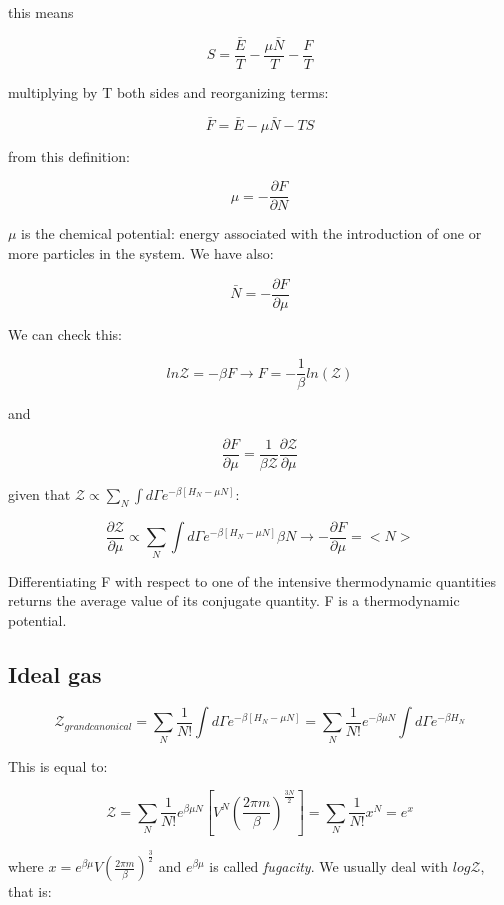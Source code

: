 \documentclass[a4paper, italian, openany]{book}
\begin{document}
this means

$$S = \frac{\bar{E}}{T} - \frac{\mu \bar{N}}{T} - \frac{F}{T}$$

multiplying by T both sides and reorganizing terms:

$$\bar{F} = \bar{E} - \mu\bar{N} -TS$$

from this definition:

$$\mu = -\frac{\partial F}{\partial N}$$

$\mu$ is the chemical potential: energy associated with the introduction of one or more particles in the system. We have also:

$$\bar{N} = -\frac{\partial F}{\partial \mu}$$

We can check this:

$$ln \mathcal{Z} = -\beta F \rightarrow F = -\frac{1}{\beta} ln(\mathcal{Z})$$

and

$$\frac{\partial F}{\partial \mu} = \frac{1}{\beta \mathcal{Z}} \frac{\partial \mathcal{Z}}{\partial \mu}$$

given that $\mathcal{Z} \propto \sum_N \int d\Gamma e^{-\beta\left [ H_N - \mu N \right ]}$:

$$\frac{\partial \mathcal{Z}}{\partial \mu} \propto \sum_N \int d\Gamma e^{-\beta \left [ H_N - \mu N \right ]} \beta N \rightarrow -\frac{\partial F}{\partial \mu} = <N>$$

Differentiating F with respect to one of the intensive thermodynamic quantities returns the average value of its conjugate quantity. F is a thermodynamic potential.

\subsection{Ideal gas}

$$\mathcal{Z}_{grand canonical} = \sum_N \frac{1}{N!} \int d\Gamma e^{-\beta\left [ H_N - \mu N \right ]} = \sum_N \frac{1}{N!} e^{-\beta \mu N} \int d\Gamma e^{-\beta H_N}$$

This is equal to:

$$\mathcal{Z} = \sum_N \frac{1}{N!} e^{\beta \mu N} \left [ V^N \left ( \frac{2\pi m}{\beta} \right )^{\frac{3N}{2}} \right ] = \sum_N \frac{1}{N!} x^N = e^x$$

where $x = e^{\beta \mu} V \left ( \frac{2\pi m}{\beta} \right )^{\frac{3}{2}}$ and $e^{\beta \mu}$ is called \textit{fugacity}.\newline
We usually deal with $log\mathcal{Z}$, that is:
\end{document}
